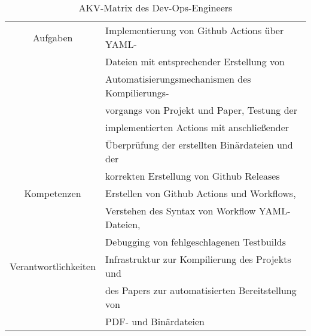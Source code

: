 \begin{table}[H]
    \begin{center}
        \label{tab:devopsengineer}
        \begin{tabular}{c|p{9cm}}
            Aufgaben & Implementierung von Github Actions über YAML- \\
            & Dateien mit entsprechender Erstellung von \\
            & Automatisierungsmechanismen des Kompilierungs- \\ 
            & vorgangs von Projekt und Paper, Testung der\\
            & implementierten Actions mit anschließender \\
            & Überprüfung der erstellten Binärdateien und der \\
            & korrekten Erstellung von Github Releases \\
            \hline
            Kompetenzen & Erstellen von Github Actions und Workflows,  \\
            & Verstehen des Syntax von Workflow YAML-Dateien, \\
            & Debugging von fehlgeschlagenen Testbuilds \\
            \hline
            Verantwortlichkeiten & Infrastruktur zur Kompilierung des Projekts und \\
            & des Papers zur automatisierten Bereitstellung von \\
            & PDF- und Binärdateien \\
        \end{tabular}
        \caption{AKV-Matrix des Dev-Ops-Engineers}
    \end{center}
\end{table}
